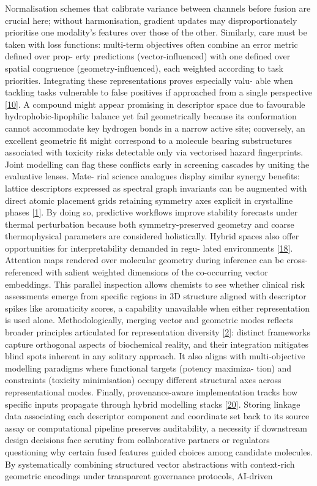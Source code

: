 \documentclass[
]{article}
\begin{document}
Normalisation schemes that calibrate variance between channels before
fusion are crucial here; without harmonisation, gradient updates may
disproportionately prioritise one modality's features over those of the
other. Similarly, care must be taken with loss functions: multi-term
objectives often combine an error metric defined over prop- erty
predictions (vector-influenced) with one defined over spatial congruence
(geometry-influenced), each weighted according to task priorities.
Integrating these representations proves especially valu- able when
tackling tasks vulnerable to false positives if approached from a single
perspective {[}\hyperref[_bookmark50]{10}{]}. A compound might appear
promising in descriptor space due to favourable hydrophobic-lipophilic
balance yet fail geometrically because its conformation cannot
accommodate key hydrogen bonds in a narrow active site; conversely, an
excellent geometric fit might correspond to a molecule bearing
substructures associated with toxicity risks detectable only via
vectorised hazard fingerprints. Joint modelling can flag these conflicts
early in screening cascades by uniting the evaluative lenses. Mate- rial
science analogues display similar synergy benefits: lattice descriptors
expressed as spectral graph invariants can be augmented with direct
atomic placement grids retaining symmetry axes explicit in crystalline
phases {[}\hyperref[_bookmark41]{1}{]}. By doing so, predictive
workflows improve stability forecasts under thermal perturbation because
both symmetry-preserved geometry and coarse thermophysical parameters
are considered holistically. Hybrid spaces also offer opportunities for
interpretability demanded in regu- lated environments
{[}\hyperref[_bookmark58]{18}{]}. Attention maps rendered over molecular
geometry during inference can be cross-referenced with salient weighted
dimensions of the co-occurring vector embeddings. This parallel
inspection allows chemists to see whether clinical risk assessments
emerge from specific regions in 3D structure aligned with descriptor
spikes like aromaticity scores, a capability unavailable when either
representation is used alone. Methodologically, merging vector and
geometric modes reflects broader principles articulated for
representation diversity {[}\hyperref[_bookmark42]{2}{]}: distinct
frameworks capture orthogonal aspects of biochemical reality, and their
integration mitigates blind spots inherent in any solitary approach. It
also aligns with multi-objective modelling paradigms where functional
targets (potency maximiza- tion) and constraints (toxicity minimisation)
occupy different structural axes across representational modes. Finally,
provenance-aware implementation tracks how specific inputs propagate
through hybrid modelling stacks {[}\hyperref[_bookmark60]{20}{]}.
Storing linkage data associating each descriptor component and
coordinate set back to its source assay or computational pipeline
preserves auditability, a necessity if downstream design decisions face
scrutiny from collaborative partners or regulators questioning why
certain fused features guided choices among candidate molecules. By
systematically combining structured vector abstractions with
context-rich geometric encodings under transparent governance protocols,
AI-driven
\end{document}
